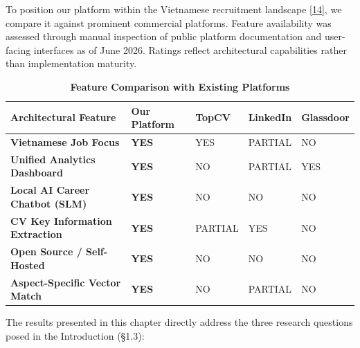 \documentclass[12pt, a4paper]{report}
\begin{document}
\vspace{0.8cm}
\vspace{0.4cm}

To position our platform within the Vietnamese recruitment landscape [\hyperlink{cite14}{14}], we compare it against prominent commercial platforms. Feature availability was assessed through manual inspection of public platform documentation and user-facing interfaces as of June 2026. Ratings reflect architectural capabilities rather than implementation maturity.

\begin{table}[H]
    \centering
    \caption[Feature Comparison with Existing Platforms]{\textbf{Feature Comparison with Existing Platforms}}
    \vspace{0.2cm}
    \normalsize
    \renewcommand{\arraystretch}{1.3}
    \begin{tabularx}{\textwidth}{Z{2.0} | Z{0.75} | Z{0.75} | Z{0.75} | Z{0.75}}
    \hline\hline
    Architectural Feature & Our Platform & TopCV & LinkedIn & Glassdoor \\
    \hline
    \textbf{Vietnamese Job Focus} & \textbf{YES} & YES & PARTIAL & NO \\
    \textbf{Unified Analytics Dashboard} & \textbf{YES} & NO & PARTIAL & YES \\
    \textbf{Local AI Career Chatbot (SLM)} & \textbf{YES} & NO & NO & NO \\
    \textbf{CV Key Information Extraction} & \textbf{YES} & PARTIAL & YES & NO \\
    \textbf{Open Source / Self-Hosted} & \textbf{YES} & NO & NO & NO \\
    \textbf{Aspect-Specific Vector Match} & \textbf{YES} & NO & PARTIAL & NO \\
    \hline\hline
    \end{tabularx}
\end{table}

\vspace{0.8cm}
\vspace{0.4cm}

The results presented in this chapter directly address the three research questions posed in the Introduction (\S1.3):
\end{document}
